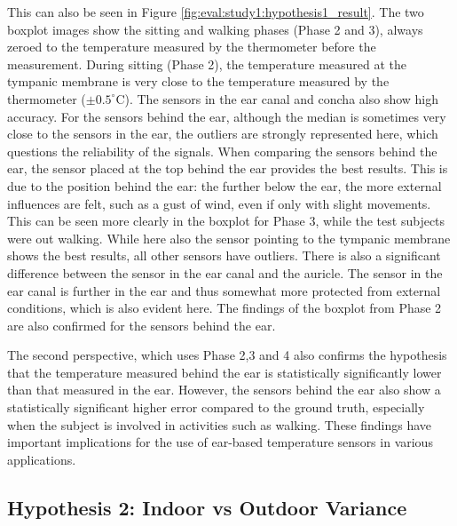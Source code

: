 This can also be seen in Figure \ref{fig:eval:study1:hypothesis1_result}.
The two boxplot images show the sitting and walking phases (Phase 2 and 3), always zeroed to the temperature measured by the thermometer before the measurement.
During sitting (Phase 2), the temperature measured at the tympanic membrane is very close to the temperature measured by the thermometer ($\pm0.5^\circ\text{C}$). 
The sensors in the ear canal and concha also show high accuracy. 
For the sensors behind the ear, although the median is sometimes very close to the sensors in the ear, the outliers are strongly represented here, which questions the reliability of the signals.
When comparing the sensors behind the ear, the sensor placed at the top behind the ear provides the best results. 
This is due to the position behind the ear: the further below the ear, the more external influences are felt, such as a gust of wind, even if only with slight movements.
This can be seen more clearly in the boxplot for Phase 3, while the test subjects were out walking. 
While here also the sensor pointing to the tympanic membrane shows the best results, all other sensors have outliers.
There is also a significant difference between the sensor in the ear canal and the auricle. 
The sensor in the ear canal is further in the ear and thus somewhat more protected from external conditions, which is also evident here. 
The findings of the boxplot from Phase 2 are also confirmed for the sensors behind the ear.

The second perspective, which uses Phase 2,3 and 4 also confirms the hypothesis that the temperature measured behind the ear is statistically significantly lower than that measured in the ear. 
However, the sensors behind the ear also show a statistically significant higher error compared to the ground truth, especially when the subject is involved in activities such as walking. 
These findings have important implications for the use of ear-based temperature sensors in various applications.

\subsection{Hypothesis 2: Indoor vs Outdoor Variance}
\label{subsec:Evaluation:Study2:Hypothesis2}

